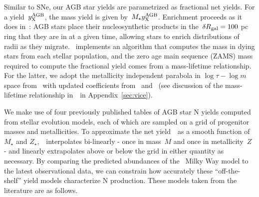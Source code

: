 \documentclass[ms.tex]{subfiles}
\begin{document}
Similar to SNe, our AGB star yields are parametrized as fractional net yields.
For a yield~$y_\text{X}^\text{AGB}$, the mass yield is given by~$M_\star y_\text{X}^\text{AGB}$.
Enrichment proceeds as it does in~\citet{Johnson2021}: AGB stars place their
nucleosynthetic products in the~$\delta R_\text{gal} = 100$ pc ring that they are in at
a given time, allowing stars to enrich distributions of radii as they migrate.
\vice~implements an algorithm that computes the mass in dying stars
from each stellar population, and the zero age main sequence (ZAMS) mass
required to compute the fractional yield comes from a mass-lifetime
relationship. 
For the latter, we adopt the metallicity independent parabola in
$\log\tau - \log m$ space from~\citet{Larson1974} with updated coefficients
from~\citet{Kobayashi2004} and~\citet*{David1990} (see discussion of the
mass-lifetime relationship in~\vice~in Appendix~\ref{sec:vice}).
\par
We make use of four previously published tables of AGB star N yields
computed from stellar evolution models, each of which are sampled on a grid
of progenitor masses and metallicities.
To approximate the net yield~~as a smooth function of~$M_\star$ and
$Z_\star$,~\vice~interpolates bi-linearly - once in mass~$M$ and once in
metallicity~$Z$ - and linearly extrapolates above or below the grid in either
quantity as necessary.
By comparing the predicted abundances of the~\citet{Johnson2021} Milky Way
model to the latest observational data, we can constrain how accurately these
``off-the-shelf'' yield models characterize N production.
These models taken from the literature are as follows.
\end{document}
